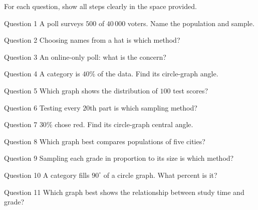 \documentclass[11pt]{article}
\begin{document}
\clearpage
{}
For each question, show all steps clearly in the space provided.

\begin{qbox}{Question 1}
A poll surveys $500$ of $40\,000$ voters. Name the population and sample.\workspace{2.4cm}
\end{qbox}

\begin{qbox}{Question 2}
Choosing names from a hat is which method?\workspace{2.4cm}
\end{qbox}

\begin{qbox}{Question 3}
An online-only poll: what is the concern?\workspace{2.4cm}
\end{qbox}

\begin{qbox}{Question 4}
A category is $40\%$ of the data. Find its circle-graph angle.\workspace{2.4cm}
\end{qbox}

\begin{qbox}{Question 5}
Which graph shows the distribution of $100$ test scores?\workspace{2.4cm}
\end{qbox}

\begin{qbox}{Question 6}
Testing every $20$th part is which sampling method?\workspace{2.4cm}
\end{qbox}

\begin{qbox}{Question 7}
$30\%$ chose red. Find its circle-graph central angle.\workspace{2.4cm}
\end{qbox}

\begin{qbox}{Question 8}
Which graph best compares populations of five cities?\workspace{2.4cm}
\end{qbox}

\begin{qbox}{Question 9}
Sampling each grade in proportion to its size is which method?\workspace{2.4cm}
\end{qbox}

\begin{qbox}{Question 10}
A category fills $90^\circ$ of a circle graph. What percent is it?\workspace{2.4cm}
\end{qbox}

\begin{qbox}{Question 11}
Which graph best shows the relationship between study time and grade?\workspace{2.4cm}
\end{qbox}
\end{document}
